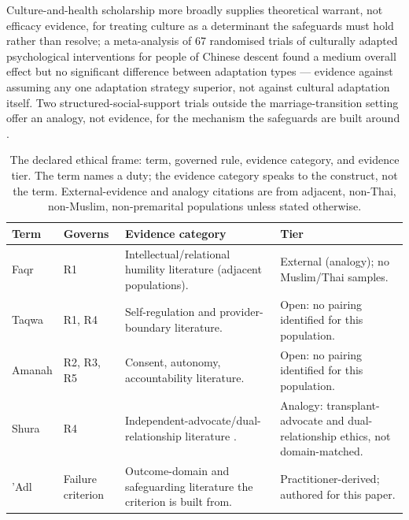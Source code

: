 \documentclass[11pt]{article}
\begin{document}
Culture-and-health scholarship more broadly supplies theoretical warrant, not efficacy evidence, for treating culture as a determinant the safeguards must hold rather than resolve; a meta-analysis of 67 randomised trials of culturally adapted psychological interventions for people of Chinese descent found a medium overall effect but no significant difference between adaptation types \cite{ref89} --- evidence against assuming any one adaptation strategy superior, not against cultural adaptation itself. Two structured-social-support trials outside the marriage-transition setting offer an analogy, not evidence, for the mechanism the safeguards are built around \cite{ref90,ref91}.

\begin{table}[t]
\centering\footnotesize
\caption{The declared ethical frame: term, governed rule, evidence category, and evidence tier. The term names a duty; the evidence category speaks to the construct, not the term. External-evidence and analogy citations are from adjacent, non-Thai, non-Muslim, non-premarital populations unless stated otherwise.}
\label{tab:ethic}
\begin{tabularx}{\textwidth}{@{}p{1.3cm}p{1.4cm}YY@{}}
\toprule
\textbf{Term} & \textbf{Governs} & \textbf{Evidence category} & \textbf{Tier}\\
\midrule
Faqr & R1 & Intellectual/relational humility literature (adjacent populations). & External (analogy); no Muslim/Thai samples.\\
Taqwa & R1, R4 & Self-regulation and provider-boundary literature. & Open: no pairing identified for this population.\\
Amanah & R2, R3, R5 & Consent, autonomy, accountability literature. & Open: no pairing identified for this population.\\
Shura & R4 & Independent-advocate/dual-relationship literature \cite{ref159,ref163}. & Analogy: transplant-advocate and dual-relationship ethics, not domain-matched.\\
'Adl & Failure criterion & Outcome-domain and safeguarding literature the criterion is built from. & Practitioner-derived; authored for this paper.\\
\bottomrule
\end{tabularx}
\end{table}
\FloatBarrier
\end{document}
